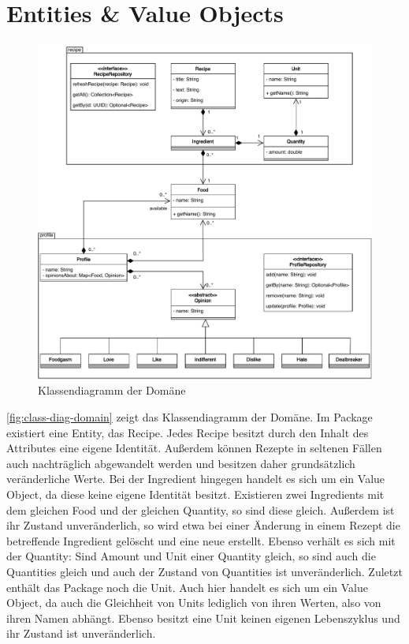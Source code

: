 \section{Entities \& Value Objects}

\begin{figure}[ht!]
    \includegraphics[width=0.98\columnwidth]{../diagrams/domain_uml.pdf}
    \caption{Klassendiagramm der Domäne}
    \label{fig:class-diag-domain}
\end{figure}

\autoref{fig:class-diag-domain} zeigt das Klassendiagramm der Domäne. Im Package \href{https://github.com/anditru/quickie/tree/bb41442c7f1ffbfcd3117cd86a40f7932e543a33/3-quickie-domain/src/main/java/org/pinkcrazyunicorn/quickie/domain/recipe}{} existiert eine Entity, das Recipe. Jedes Recipe besitzt durch den Inhalt des Attributes  eine eigene Identität. Außerdem können Rezepte in seltenen Fällen auch nachträglich abgewandelt werden und besitzen daher grundsätzlich veränderliche Werte. Bei der Ingredient hingegen handelt es sich um ein Value Object, da diese keine eigene Identität besitzt. Existieren zwei Ingredients mit dem gleichen Food und der gleichen Quantity, so sind diese gleich. Außerdem ist ihr Zustand unveränderlich, so wird etwa bei einer Änderung in einem Rezept die betreffende Ingredient gelöscht und eine neue erstellt. Ebenso verhält es sich mit der Quantity: Sind Amount und Unit einer Quantity gleich, so sind auch die Quantities gleich und auch der Zustand von Quantities ist unveränderlich. Zuletzt enthält das Package noch die Unit. Auch hier handelt es sich um ein Value Object, da auch die Gleichheit von Units lediglich von ihren Werten, also von ihren Namen abhängt. Ebenso besitzt eine Unit keinen eigenen Lebenszyklus und ihr Zustand ist unveränderlich.

